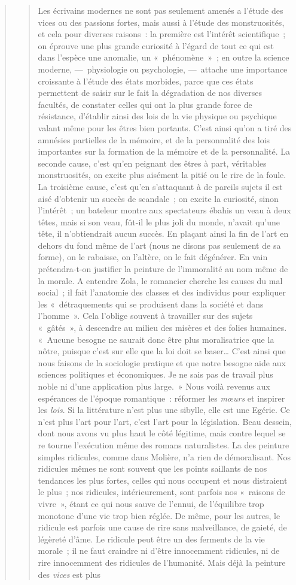 \documentclass[french,twoside]{book} %
\begin{document}
\begin{verse}
\begin{verse}
Les écrivains modernes ne sont pas seulement amenés a l’étude des vices ou des passions fortes, mais aussi à l’étude des monstruosités, et cela pour diverses raisons : la première est l’intérêt scientifique ; on éprouve une plus grande curiosité à l’égard de tout ce qui est dans l’espèce une anomalie, un « phénomène » ; en outre la science moderne, — physiologie ou psychologie, — attache une importance croissante à l’étude des états morbides, parce que ces états permettent de saisir sur le fait la dégradation de nos diverses facultés, de constater celles qui ont la plus grande force de résistance, d’établir ainsi des lois de la vie physique ou psychique valant même pour les êtres bien portants. C’est ainsi qu’on a tiré des amnésies partielles de la mémoire, et de la personnalité des lois importantes sur la formation de la mémoire et de la personnalité. La seconde cause, c’est qu’en peignant des êtres à part, véritables monstruosités, on excite plus aisément la pitié ou le rire de la foule. La troisième cause, c’est qu’en s’attaquant à de pareils sujets il est aisé d’obtenir un succès de scandale ; on excite la curiosité, sinon l’intérêt ; un bateleur montre aux spectateurs ébahis un veau à deux têtes, mais si son veau, fût-il le plus joli du monde, n’avait qu’une tête, il n’obtiendrait aucun succès. En plaçant ainsi la fin de l’art en dehors du fond même de l’art (nous ne disons pas seulement de sa forme), on le rabaisse, on l’altère, on le fait dégénérer. En vain prétendra-t-on justifier la peinture de l’immoralité au nom même de la morale. A entendre Zola, le romancier cherche les causes du mal social ; il fait l’anatomie des classes et des individus pour expliquer les « détraquements qui se produisent dans la société et dans l’homme ». Cela l’oblige souvent à travailler sur des sujets « gâtés », à descendre au milieu des misères et des folies humaines. « Aucune besogne ne saurait donc être plus moralisatrice que la nôtre, puisque c’est sur elle que la loi doit se baser… C’est ainsi que nous faisons de la sociologie pratique et que notre besogne aide aux sciences politiques et économiques. Je ne sais pas de travail plus noble ni d’une application plus large. » Nous voilà revenus aux espérances de l’époque romantique : réformer les \emph{mœurs} et inspirer les \emph{lois}. Si la littérature n’est plus une sibylle, elle est une Egérie. Ce n’est plus l’art pour l’art, c’est l’art pour la législation. Beau dessein, dont nous avons vu plus haut le côté légitime, mais contre lequel se re tourne l’exécution même des romans naturalistes. La des peinture simples ridicules, comme dans Molière, n’a rien de démoralisant. Nos ridicules mêmes ne sont souvent que les points saillants de nos tendances les plus fortes, celles qui nous occupent et nous distraient le plus ; nos ridicules, intérieurement, sont parfois nos « raisons de vivre », étant ce qui nous sauve de l’ennui, de l’équilibre trop monotone d’une vie trop bien réglée. De même, pour les autres, le ridicule est parfois une cause de rire sans malveillance, de gaieté, de légèreté d’âme. Le ridicule peut être un des ferments de la vie morale ; il ne faut craindre ni d’être innocemment ridicules, ni de rire innocemment des ridicules de l’humanité. Mais déjà la peinture des \emph{vices} est plus 
\end{verse}
\end{verse}
\end{document}
